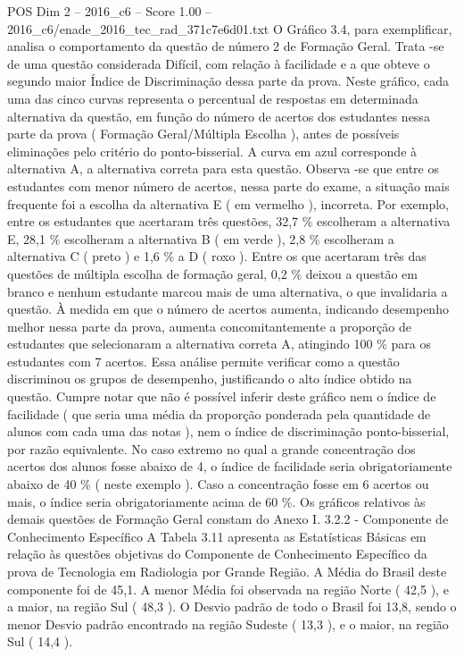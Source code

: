 \begin{textsample}{POS Dim 2 – 2016\_c6 – Score 1.00 – 2016\_c6/enade\_2016\_tec\_rad\_371c7e6d01.txt}
O Gráfico 3.4, para exemplificar, analisa o comportamento da questão de número 2 de Formação Geral.
Trata -se de uma questão considerada Difícil, com relação à facilidade e a que obteve o segundo maior Índice de Discriminação dessa parte da prova.
Neste gráfico, cada uma das cinco curvas representa o percentual de respostas em determinada alternativa da questão, em função do número de acertos dos estudantes nessa parte da prova ( Formação Geral/Múltipla Escolha ), antes de possíveis eliminações pelo critério do ponto-bisserial.
A curva em azul corresponde à alternativa A, a alternativa correta para esta questão.
Observa -se que entre os estudantes com menor número de acertos, nessa parte do exame, a situação mais frequente foi a escolha da alternativa E ( em vermelho ), incorreta.
Por exemplo, entre os estudantes que acertaram três questões, 32,7 \% escolheram a alternativa E, 28,1 \% escolheram a alternativa B ( em verde ), 2,8 \% escolheram a alternativa C ( preto ) e 1,6 \% a D ( roxo ).
Entre os que acertaram três das questões de múltipla escolha de formação geral, 0,2 \% deixou a questão em branco e nenhum estudante marcou mais de uma alternativa, o que invalidaria a questão.
À medida em que o número de acertos aumenta, indicando desempenho melhor nessa parte da prova, aumenta concomitantemente a proporção de estudantes que selecionaram a alternativa correta A, atingindo 100 \% para os estudantes com 7 acertos.
Essa análise permite verificar como a questão discriminou os grupos de desempenho, justificando o alto índice obtido na questão.
Cumpre notar que não é possível inferir deste gráfico nem o índice de facilidade ( que seria uma média da proporção ponderada pela quantidade de alunos com cada uma das notas ), nem o índice de discriminação ponto-bisserial, por razão equivalente.
No caso extremo no qual a grande concentração dos acertos dos alunos fosse abaixo de 4, o índice de facilidade seria obrigatoriamente abaixo de 40 \% ( neste exemplo ).
Caso a concentração fosse em 6 acertos ou mais, o índice seria obrigatoriamente acima de 60 \%.
Os gráficos relativos às demais questões de Formação Geral constam do Anexo I. 3.2.2 - Componente de Conhecimento Específico A Tabela 3.11 apresenta as Estatísticas Básicas em relação às questões objetivas do Componente de Conhecimento Específico da prova de Tecnologia em Radiologia por Grande Região.
A Média do Brasil deste componente foi de 45,1.
A menor Média foi observada na região Norte ( 42,5 ), e a maior, na região Sul ( 48,3 ).
O Desvio padrão de todo o Brasil foi 13,8, sendo o menor Desvio padrão encontrado na região Sudeste ( 13,3 ), e o maior, na região Sul ( 14,4 ).

\end{textsample}
